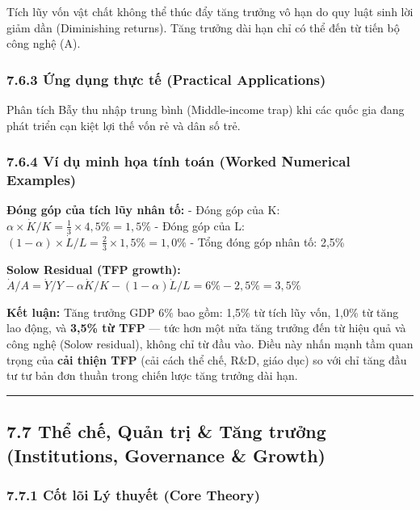 \documentclass[
]{article}
\begin{document}
Tích lũy vốn vật chất không thể thúc đẩy tăng trưởng vô hạn do quy luật
sinh lời giảm dần (Diminishing returns). Tăng trưởng dài hạn chỉ có thể
đến từ tiến bộ công nghệ (A).

\subsubsection{7.6.3 Ứng dụng thực tế (Practical
Applications)}\label{ux1ee9ng-dux1ee5ng-thux1ef1c-tux1ebf-practical-applications-22}

Phân tích Bẫy thu nhập trung bình (Middle-income trap) khi các quốc gia
đang phát triển cạn kiệt lợi thế vốn rẻ và dân số trẻ.

\subsubsection{7.6.4 Ví dụ minh họa tính toán (Worked Numerical
Examples)}\label{vuxed-dux1ee5-minh-hux1ecda-tuxednh-touxe1n-worked-numerical-examples-21}

\textbf{Đóng góp của tích lũy nhân tố:} - Đóng góp của K:
\(\alpha \times \dot{K}/K = \frac{1}{3} \times 4{,}5\% = 1{,}5\%\) -
Đóng góp của L:
\((1-\alpha) \times \dot{L}/L = \frac{2}{3} \times 1{,}5\% = 1{,}0\%\) -
Tổng đóng góp nhân tố: 2,5\%

\textbf{Solow Residual (TFP growth):}
\(\dot{A}/A = \dot{Y}/Y - \alpha\dot{K}/K - (1-\alpha)\dot{L}/L = 6\% - 2{,}5\% = 3{,}5\%\)

\textbf{Kết luận:} Tăng trưởng GDP 6\% bao gồm: 1,5\% từ tích lũy vốn,
1,0\% từ tăng lao động, và \textbf{3,5\% từ TFP} --- tức hơn một nửa
tăng trưởng đến từ hiệu quả và công nghệ (Solow residual), không chỉ từ
đầu vào. Điều này nhấn mạnh tầm quan trọng của \textbf{cải thiện TFP}
(cải cách thể chế, R\&D, giáo dục) so với chỉ tăng đầu tư tư bản đơn
thuần trong chiến lược tăng trưởng dài hạn.

\begin{center}\rule{0.5\linewidth}{0.5pt}\end{center}

\subsection{7.7 Thể chế, Quản trị \& Tăng trưởng (Institutions,
Governance \&
Growth)}\label{thux1ec3-chux1ebf-quux1ea3n-trux1ecb-tux103ng-trux1b0ux1edfng-institutions-governance-growth}

\subsubsection{7.7.1 Cốt lõi Lý thuyết (Core
Theory)}\label{cux1ed1t-luxf5i-luxfd-thuyux1ebft-core-theory-22}
\end{document}
